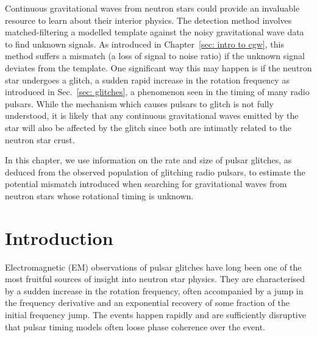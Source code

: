 \documentclass[../full_thesis/full_thesis.tex]{subfiles}
\begin{document}
Continuous gravitational waves from neutron stars could provide an invaluable
resource to learn about their interior physics. The detection method involves
matched-filtering a modelled template against the noisy gravitational wave data
to find unknown signals. As introduced in Chapter~\ref{sec: intro to cgw}, this
method suffers a mismatch (a loss of signal to noise ratio) if the unknown
signal deviates from the template. One significant way this may happen is if
the neutron star undergoes a glitch, a sudden rapid increase in the rotation
frequency as introduced in Sec.~\ref{sec: glitches}, a phenomenon seen in the
timing of many radio pulsars.  While the mechanism which causes pulsars to
glitch is not fully understood, it is likely that any continuous
gravitational waves emitted by the star will also be affected by the glitch since
both are intimatly related to the neutron star crust.

In this chapter, we use information on the rate and size of pulsar glitches, as
deduced from the observed population of glitching radio pulsars, to estimate
the potential mismatch introduced when searching for gravitational waves from
neutron stars whose rotational timing is unknown.


\section{Introduction}
\label{sec: glitches introduction}

Electromagnetic (EM) observations of pulsar glitches have long been one of the most
fruitful sources of insight into neutron star physics. They are characterised
by a sudden increase in the rotation frequency, often accompanied by a jump in
the frequency derivative and an exponential recovery of some fraction of the
initial frequency jump. The events happen
rapidly and are sufficiently disruptive that pulsar timing models often loose phase
coherence over the event.
\end{document}
